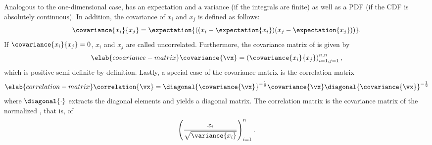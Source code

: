 Analogous to the one-dimensional case, \vx has an expectation and a variance (if
the integrals are finite) as well as a \ac{PDF} (if the \ac{CDF} is absolutely
continuous). In addition, the covariance of $x_i$ and $x_j$ is defined as
follows:
\[
  \covariance{x_i}{x_j} = \expectation{((x_i - \expectation{x_i})(x_j - \expectation{x_j}))}.
\]
If $\covariance{x_i}{x_j} = 0$, $x_i$ and $x_j$ are called uncorrelated.
Furthermore, the covariance matrix of \vx is given by
\begin{equation} \elab{covariance-matrix}
  \covariance{\vx} = \left(\covariance{x_i}{x_j}\right)_{i = 1, j = 1}^{n, n},
\end{equation}
which is positive semi-definite by definition. Lastly, a special case of the
covariance matrix is the correlation matrix
\begin{equation} \elab{correlation-matrix}
  \correlation{\vx} = \diagonal{\covariance{\vx}}^{-\frac{1}{2}} \covariance{\vx} \diagonal{\covariance{\vx}}^{-\frac{1}{2}}
\end{equation}
where $\diagonal{\cdot}$ extracts the diagonal elements and yields a diagonal
matrix. The correlation matrix is the covariance matrix of the normalized \vx,
that is, of
\[
  \left(\frac{x_i}{\sqrt{\variance{x_i}}}\right)_{i = 1}^n.
\]
